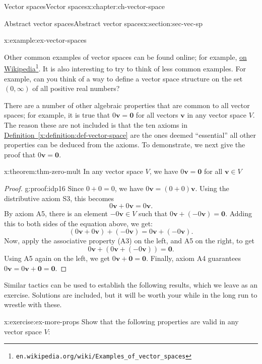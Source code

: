 \documentclass[oneside,10pt,]{book}
\newcommand{\xreffont}{\relax}
\numberwithin{equation}{section}
\newcommand{\vv}{\mathbf{v}}
\newcommand{\zer}{\mathbf{0}}
\begin{document}
\begin{chapterptx}{Vector spaces}{}{Vector spaces}{}{}{x:chapter:ch-vector-space}
\begin{sectionptx}{Abstract vector spaces}{}{Abstract vector spaces}{}{}{x:section:sec-vec-sp}
\begin{example}{}{x:example:ex-vector-spaces}
\begin{enumerate}
\end{enumerate}
%
\end{example}
Other common examples of vector spaces can be found online; for example, \href{https://en.wikipedia.org/wiki/Examples_of_vector_spaces}{on Wikipedia}\footnote{\nolinkurl{en.wikipedia.org/wiki/Examples_of_vector_spaces}\label{g:fn:idp15}}. It is also interesting to try to think of less common examples. For example, can you think of a way to define a vector space structure on the set \((0,\infty)\) of all positive real numbers?%
\par
There are a number of other algebraic properties that are common to all vector spaces; for example, it is true that \(0\vv = \zer\) for all vectors \(\vv\) in any vector space \(V\). The reason these are not included is that the ten axioms in \hyperref[x:definition:def-vector-space]{Definition~{\xreffont\ref{x:definition:def-vector-space}}} are the ones deemed ``essential'' \textendash{} all other properties can be deduced from the axioms. To demonstrate, we next give the proof that \(0\vv = \zer\).%
\begin{theorem}{}{}{x:theorem:thm-zero-mult}%
In any vector space \(V\), we have \(0\vv = \zer\) for all \(\vv\in V\)%
\end{theorem}
\begin{proof}{}{g:proof:idp16}
Since \(0+0=0\), we have \(0\vv=(0+0)\vv\). Using the distributive axiom S3, this becomes%
\begin{equation*}
0\vv + 0\vv = 0\vv\text{.}
\end{equation*}
By axiom A5, there is an element \(-0\vv\in V\) such that \(0\vv+(-0\vv)=\zer\). Adding this to both sides of the equation above, we get:%
\begin{equation*}
(0\vv+0\vv)+(-0\vv) = 0\vv+(-0\vv)\text{.}
\end{equation*}
Now, apply the associative property (A3) on the left, and A5 on the right, to get%
\begin{equation*}
0\vv + (0\vv+(-0\vv)) = \zer\text{.}
\end{equation*}
Using A5 again on the left, we get \(0\vv+\zer = \zer\). Finally, axiom A4 guarantees \(0\vv = 0\vv+\zer = \zer\).%
\end{proof}
Similar tactics can be used to establish the following results, which we leave as an exercise. Solutions are included, but it will be worth your while in the long run to wrestle with these.%
\begin{inlineexercise}{}{x:exercise:ex-more-props}%
Show that the following properties are valid in any vector space \(V\):%

\end{inlineexercise}
\end{sectionptx}
\end{chapterptx}
\end{document}
